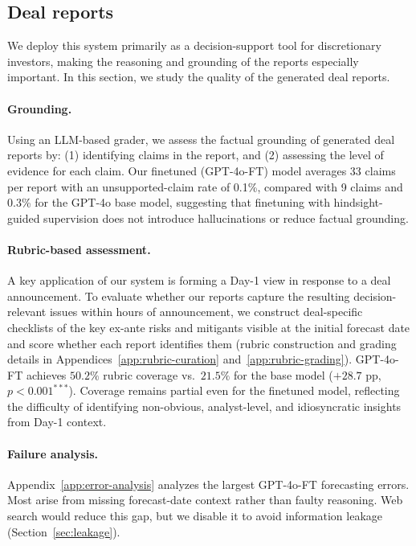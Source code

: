 \documentclass{article}
\theoremstyle{plain}
\theoremstyle{definition}
\theoremstyle{remark}
\begin{document}
\subsection{Deal reports}
\label{sec:qualitative-analysis}

We deploy this system primarily as a decision-support tool for discretionary investors, making the reasoning and grounding of the reports especially important. In this section, we study the quality of the generated deal reports.

\paragraph{Grounding.}
Using an LLM-based grader, we assess the factual grounding of generated deal reports by: (1) identifying claims in the report, and (2) assessing the level of evidence for each claim. Our finetuned (GPT-4o-FT) model averages 33 claims per report with an unsupported-claim rate of 0.1\%, compared with 9 claims and 0.3\% for the GPT-4o base model, suggesting that finetuning with hindsight-guided supervision does not introduce hallucinations or reduce factual grounding.

\paragraph{Rubric-based assessment.}
A key application of our system is forming a Day-1 view in response to a deal announcement. To evaluate whether our reports capture the resulting decision-relevant issues within hours of announcement, we construct deal-specific checklists of the key ex-ante risks and mitigants visible at the initial forecast date and score whether each report identifies them (rubric construction and grading details in Appendices~\ref{app:rubric-curation} and~\ref{app:rubric-grading}). GPT-4o-FT achieves $50.2\%$ rubric coverage vs.\ $21.5\%$ for the base model (${+}28.7$ pp,  $p{<}0.001^{***}$). Coverage remains partial even for the finetuned model, reflecting the difficulty of identifying non-obvious, analyst-level, and idiosyncratic insights from Day-1 context.

\paragraph{Failure analysis.}
Appendix~\ref{app:error-analysis} analyzes the largest GPT-4o-FT forecasting errors. Most arise from missing forecast-date context rather than faulty reasoning. Web search would reduce this gap, but we disable it to avoid information leakage (Section~\ref{sec:leakage}).
\end{document}
